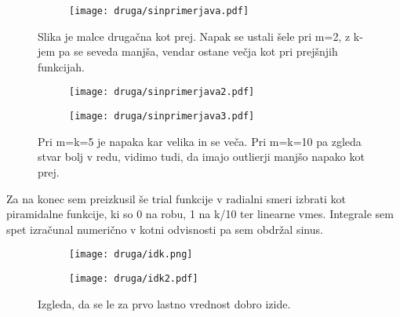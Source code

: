 \documentclass{article}
\begin{document}
\begin{figure}[H]
\centering
\begin{subfigure}{\textwidth}
\texttt{[image: druga/sinprimerjava.pdf]}
\end{subfigure}
\caption*{Slika je malce drugačna kot prej. Napak se ustali šele pri m=2, z k-jem pa se seveda manjša, vendar ostane večja kot pri prejšnjih funkcijah. }
\end{figure}

\begin{figure}[H]
\centering
\begin{subfigure}{.49\textwidth}
\texttt{[image: druga/sinprimerjava2.pdf]}
\end{subfigure}
\begin{subfigure}{.49\textwidth}
\texttt{[image: druga/sinprimerjava3.pdf]}
\end{subfigure}
\caption*{Pri m=k=5 je napaka kar velika in se veča. Pri m=k=10 pa zgleda stvar bolj v redu, vidimo tudi, da imajo outlierji manjšo napako kot prej.}
\end{figure}

Za na konec sem preizkusil še trial funkcije v radialni smeri izbrati kot piramidalne funkcije, ki so 0 na robu, 1 na k/10 ter linearne vmes. Integrale sem spet izračunal numerično v kotni odvisnosti pa sem obdržal sinus. 

\begin{figure}[H]
\centering
\begin{subfigure}{\textwidth}
\texttt{[image: druga/idk.png]}
\end{subfigure}
\caption*{}
\end{figure}

\begin{figure}[H]
\centering
\begin{subfigure}{\textwidth}
\texttt{[image: druga/idk2.pdf]}
\end{subfigure}
\caption*{Izgleda, da se le za prvo lastno vrednost dobro izide.}
\end{figure}
\end{document}
